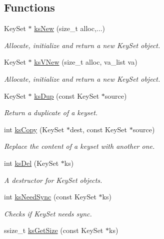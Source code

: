 \subsection*{Functions}
\begin{DoxyCompactItemize}
\item 
Key\+Set $\ast$ \hyperlink{group__keyset_ga671e1aaee3ae9dc13b4834a4ddbd2c3c}{ks\+New} (size\+\_\+t alloc,...)
\begin{DoxyCompactList}\small\item\em Allocate, initialize and return a new Key\+Set object. \end{DoxyCompactList}\item 
Key\+Set $\ast$ \hyperlink{group__keyset_ga4ff760f56693b51ab785ed7ce628e649}{ks\+V\+New} (size\+\_\+t alloc, va\+\_\+list va)
\begin{DoxyCompactList}\small\item\em Allocate, initialize and return a new Key\+Set object. \end{DoxyCompactList}\item 
Key\+Set $\ast$ \hyperlink{group__keyset_gac59e4b328245463f1451f68d5106151c}{ks\+Dup} (const Key\+Set $\ast$source)
\begin{DoxyCompactList}\small\item\em Return a duplicate of a keyset. \end{DoxyCompactList}\item 
int \hyperlink{group__keyset_gaba1f1dbea191f4d7e7eb3e4296ae7d5e}{ks\+Copy} (Key\+Set $\ast$dest, const Key\+Set $\ast$source)
\begin{DoxyCompactList}\small\item\em Replace the content of a keyset with another one. \end{DoxyCompactList}\item 
int \hyperlink{group__keyset_ga27e5c16473b02a422238c8d970db7ac8}{ks\+Del} (Key\+Set $\ast$ks)
\begin{DoxyCompactList}\small\item\em A destructor for Key\+Set objects. \end{DoxyCompactList}\item 
int \hyperlink{group__keyset_ga8f210432e664d8ba06d7d55a2aba2d0f}{ks\+Need\+Sync} (const Key\+Set $\ast$ks)
\begin{DoxyCompactList}\small\item\em Checks if Key\+Set needs sync. \end{DoxyCompactList}\item 
ssize\+\_\+t \hyperlink{group__keyset_ga7474ad6b0a0fa969dbdf267ba5770eee}{ks\+Get\+Size} (const Key\+Set $\ast$ks)

\end{DoxyCompactItemize}
